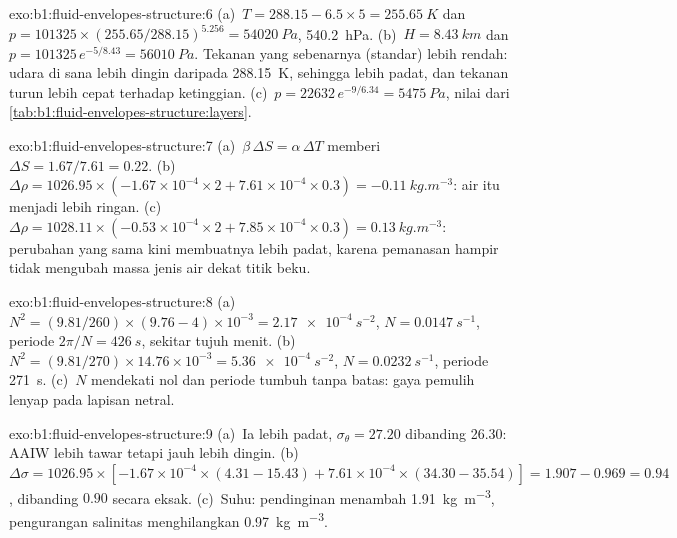 \begin{solution}{exo:b1:fluid-envelopes-structure:6}
(a)~$T = 288.15 - 6.5 \times 5 = \qty{255.65}{K}$ dan $p = \num{101325} \times
(255.65/288.15)^{5.256} = \qty{54020}{Pa}$, \qty{540.2}{hPa}. (b)~$H =
\qty{8.43}{km}$ dan $p = \num{101325}\,e^{-5/8.43} = \qty{56010}{Pa}$. Tekanan
yang sebenarnya (standar) lebih rendah: udara di sana lebih dingin daripada \qty{288.15}{K}, sehingga
lebih padat, dan tekanan turun lebih cepat terhadap ketinggian. (c)~$p = \num{22632}\,
e^{-9/6.34} = \qty{5475}{Pa}$, nilai dari
\cref{tab:b1:fluid-envelopes-structure:layers}.
\end{solution}

\begin{solution}{exo:b1:fluid-envelopes-structure:7}
(a)~$\beta\,\Delta S = \alpha\,\Delta T$ memberi $\Delta S = 1.67/7.61 = 0.22$.
(b)~$\Delta\rho = 1026.95 \times (-1.67\times10^{-4} \times 2 + 7.61\times10^{-4}
\times 0.3) = \qty{-0.11}{kg.m^{-3}}$: air itu menjadi lebih ringan.
(c)~$\Delta\rho = 1028.11 \times (-0.53\times10^{-4} \times 2 + 7.85\times10^{-4}
\times 0.3) = \qty{+0.13}{kg.m^{-3}}$: perubahan yang sama kini membuatnya lebih padat, karena
pemanasan hampir tidak mengubah massa jenis air dekat titik beku.
\end{solution}

\begin{solution}{exo:b1:fluid-envelopes-structure:8}
(a)~$N^2 = (9.81/260) \times (9.76 - 4)\times10^{-3} = \qty{2.17e-4}{s^{-2}}$,
$N = \qty{0.0147}{s^{-1}}$, periode $2\pi/N = \qty{426}{s}$, sekitar tujuh
menit. (b)~$N^2 = (9.81/270) \times 14.76\times10^{-3} = \qty{5.36e-4}{s^{-2}}$,
$N = \qty{0.0232}{s^{-1}}$, periode \qty{271}{s}. (c)~$N$ mendekati nol dan periode
tumbuh tanpa batas: gaya pemulih lenyap pada lapisan netral.
\end{solution}

\begin{solution}{exo:b1:fluid-envelopes-structure:9}
(a)~Ia lebih padat, $\sigma_\theta = 27.20$ dibanding 26.30: AAIW lebih tawar tetapi
jauh lebih dingin. (b)~$\Delta\sigma = 1026.95 \times [-1.67\times10^{-4} \times
(4.31 - 15.43) + 7.61\times10^{-4} \times (34.30 - 35.54)] = 1.907 - 0.969 =
0.94$, dibanding $0.90$ secara eksak. (c)~Suhu: pendinginan menambah
\qty{1.91}{kg.m^{-3}}, pengurangan salinitas menghilangkan \qty{0.97}{kg.m^{-3}}.
\end{solution}


